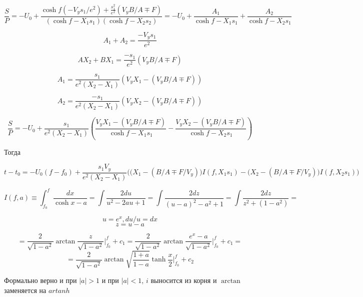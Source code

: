 $$\frac SP = -U_0 + \frac{\cosh f (-V_y s_1 / e^2) + \frac{s_1^2}{e^2}(V_y B/A \mp F)}{(\cosh f - X_1 s_1)(\cosh f - X_2 s_2)} = -U_0 + \frac{A_1}{\cosh f - X_1 s_1} + \frac{A_2}{\cosh f - X_2 s_1}$$

$$A_1+A_2 = \frac{-V_y s_1}{e^2}$$

$$A X_2 + B X_1 = \frac{-s_1}{e^2} (V_y B/A \mp F)$$

$$A_1 = \frac{s_1}{e^2(X_2-X_1)} (V_y X_1 - (V_y B/A \mp F))$$

$$A_2 = \frac{-s_1}{e^2(X_2-X_1)} (V_y X_2 - (V_y B/A \mp F))$$

$$\frac SP = -U_0 + \frac{s_1}{e^2(X_2-X_1)} \left( \frac{V_y X_1 - (V_y B/A \mp F)}{\cosh f - X_1 s_1} - \frac{V_y X_2 - (V_y B/A \mp F)}{\cosh f - X_2 s_1} \right)$$

Тогда

$$t-t_0 = -U_0 (f-f_0) + \frac{s_1 V_y}{e^2(X_2-X_1)} \Bigg( \big( X_1 - (B/A \mp F/V_y) \big) I(f, X_1 s_1) - \big( X_2 - (B/A \mp F/V_y) \big) I(f, X_2 s_1) \Bigg)$$

$$I(f,a) \equiv \int_{f_0}^f \frac{dx}{\cosh x - a} = \int \frac{2du}{u^2-2au + 1} = \int \frac{2dz}{(u-a)^2 - a^2 + 1} = \int \frac{2dz}{z^2+(1-a^2)} = $$

$$u = e^x, du/u = dx$$
$$z = u-a$$

$$= \frac{2}{\sqrt{1-a^2}} \arctan \frac{z}{\sqrt{1-a^2}}\Big|_{f_0}^f + c_1 = \frac{2}{\sqrt{1-a^2}} \arctan \frac{e^x-a}{\sqrt{1-a^2}}\Big|_{f_0}^f + c_1 = $$
$$= \frac{2}{\sqrt{1-a^2}} \arctan \sqrt{\frac{1+a}{1-a}} \tanh \frac{x}{2}\Big|_{f_0}^f + c_2$$

Формально верно и при $|a|>1$ и при $|a|<1$, $i$ выносится из корня и $\arctan$ заменяется на $artanh$